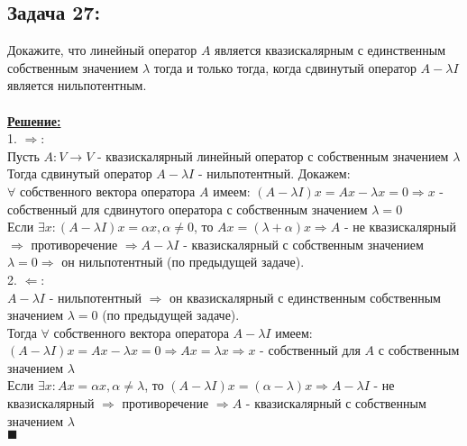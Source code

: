 \documentclass[a4paper,12pt,titlepage,final]{article}
\begin{document}
\subsection*{Задача 27:}
\noindent Докажите, что линейный оператор $A$ является квазискалярным с единственным собственным
значением $\lambda$ тогда и только тогда, когда сдвинутый оператор $A - \lambda I$ является нильпотентным. \\ \\
\textbf{\underline{Решение:}} \\
1. $\Rightarrow$: \\
Пусть $A: V \rightarrow V$ - квазискалярный линейный оператор с собственным значением $\lambda$ \\
Тогда сдвинутый оператор $A - \lambda I$ - нильпотентный. Докажем: \\
$\forall$ собственного вектора оператора $A$ имеем: $(A - \lambda I)x = Ax - \lambda x = 0 \Rightarrow x$ - 
собственный для сдвинутого оператора с собственным значением  $\lambda = 0$ \\
Если $\exists x: (A - \lambda I)x = \alpha x, \alpha \neq 0$, то $Ax = (\lambda + \alpha)x \Rightarrow A$ - не квазискалярный
$\Rightarrow$ противоречение $\Rightarrow A - \lambda I$ - квазискалярный с собственным значением $\lambda = 0 \Rightarrow$ 
он нильпотентный (по предыдущей задаче). \\
2. $\Leftarrow$: \\
$A - \lambda I$ - нильпотентный $\Rightarrow$ он квазискалярный с единственным собственным значением $\lambda = 0$ 
(по предыдущей задаче). \\
Тогда $\forall$ собственного вектора оператора $A - \lambda I$ имеем: $(A - \lambda I)x = Ax - \lambda x = 0 \Rightarrow Ax = \lambda x \Rightarrow x$ - 
собственный для $A$ с собственным значением  $\lambda$ \\
Если $\exists x: Ax = \alpha x, \alpha \neq \lambda$, то $(A - \lambda I)x = (\alpha - \lambda)x \Rightarrow A -\lambda I$ - не квазискалярный
$\Rightarrow$ противоречение $\Rightarrow A$ - квазискалярный с собственным значением $\lambda$ \\
$\blacksquare$ \\ \\ \\


\end{document}
